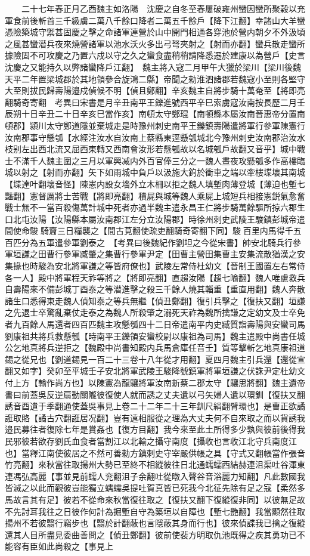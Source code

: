 　　二十七年春正月乙酉魏主如洛陽　沈慶之自冬至春屢破雍州蠻因蠻所聚穀以充軍食前後斬首三千級虜二萬八千餘口降者二萬五千餘戶【降下江翻】幸諸山大羊蠻憑險築城守禦甚固慶之擊之命諸軍連營於山中開門相通各穿池於營内朝夕不外汲頃之風甚蠻潜兵夜來燒營諸軍以池水沃火多出弓弩夾射之【射而亦翻】蠻兵散走蠻所據險固不可攻慶之乃置六戍以守之久之蠻食盡稍稍請降悉遷於建康以為營戶【史言沈慶之又能持久以弊諸蠻降戶江翻】　魏主將入寇二月甲午大獵於梁川【梁川後魏天平二年置梁城郡於其地領參合旋鴻二縣】帝聞之勑淮泗諸郡若魏寇小至則各堅守大至則拔民歸壽陽邉戍偵候不明【偵且鄭翻】辛亥魏主自將步騎十萬奄至【將即亮翻騎奇寄翻　考異曰宋書是月辛丑南平王鑠進號西平辛巳索虜寇汝南按長歷二月壬辰朔十日辛丑二十日辛亥巳當作亥】南頓太守鄭琨【南頓縣本屬汝南晉惠帝分置南頓郡】潁川太守鄭道隱並棄城走是時豫州刺史南平王鑠鎮壽陽遣將軍行參軍陳憲行汝南郡事守懸瓠【水經注汝水自汝南上蔡縣東逕懸瓠城北今豫州刺史汝南郡治汝水枝别左出西北流又屈西東轉又西南會汝形若懸瓠故以名城瓠戶故翻又音乎】城中戰士不滿千人魏主圍之三月以軍興减内外百官俸三分之一魏人晝夜攻懸瓠多作高樓臨城以射之【射而亦翻】矢下如雨城中負戶以汲施大鉤於衝車之端以牽樓堞壞其南城【堞達叶翻壞音怪】陳憲内設女墻外立木柵以拒之魏人填塹肉薄登城【薄迫也塹七豔翻】憲督厲將士苦戰【將即亮翻】積屍與城等魏人乘屍上城短兵相接憲鋭氣愈奮戰士無不一當百殺傷萬計城中死者亦過半魏主遣永昌王仁將步騎萬餘驅所掠六郡生口北屯汝陽【汝陽縣本屬汝南郡江左分立汝陽郡】時徐州刺史武陵王駿鎮彭城帝遣間使命駿騎齎三日糧襲之【間古莧翻使疏吏翻騎奇寄翻下同】駿百里内馬得千五百匹分為五軍遣參軍劉泰之　【考異曰後魏紀作劉坦之今從宋書】帥安北騎兵行參軍垣謙之田曹行參軍臧肇之集曹行參軍尹定【田曹主營田集曹主安集流散猶漢之安集掾也時駿為安北將軍謙之等皆府僚也】武陵左常侍杜幼文【晉制王國置左右常侍各一人】殿中將軍程天祚等將之【將即亮翻】直趨汝陽【趨七喻翻】魏人唯慮救兵自壽陽來不備彭城丁酉泰之等潜進擊之殺三千餘人燒其輜重【重直用翻】魏人奔散諸生口悉得東走魏人偵知泰之等兵無繼【偵丑鄭翻】復引兵擊之【復扶又翻】垣謙之先退士卒驚亂棄仗走泰之為魏人所殺肇之溺死天祚為魏所擒謙之定幼文及士卒免者九百餘人馬還者四百匹魏主攻懸瓠四十二日帝遣南平内史臧質詣壽陽與安蠻司馬劉康祖共將兵救懸瓠【時南平王鑠領安蠻校尉以康祖為司馬】魏主遣殿中尚書任城公乞地真將兵逆拒之【魏殿中尚書知殿内兵馬倉庫任音壬】質等擊斬乞地真康祖道錫之從兄也【劉道錫見一百二十三卷十八年從才用翻】夏四月魏主引兵還【還從宣翻又如字】癸卯至平城壬子安北將軍武陵王駿降號鎮軍將軍垣謙之伏誅尹定杜幼文付上方【輸作尚方也】以陳憲為龍驤將軍汝南新蔡二郡太守【驤思將翻】魏主遺帝書曰前蓋吳反逆扇動關隴彼復使人就而誘之丈夫遺以弓矢婦人遺以環釧【復扶又翻誘音酉遺于季翻通使蓋吳事見上卷二十二年二十三年釧尺絹翻臂環也】是曹正欲譎誑取賂【譎古穴翻誑居况翻】豈有遠相服從之理為大丈夫何不自來取之而以貨誘我邉民募往者復除七年是賞姦也【復方目翻】我今來至此土所得多少孰與彼前後得我民邪彼若欲存劉氏血食者當割江以北輸之攝守南度【攝收也言收江北守兵南度江也】當釋江南使彼居之不然可善勑方鎮刺史守宰嚴供帳之具【守式又翻帳當作張音竹亮翻】來秋當往取揚州大勢已至終不相縱彼往日北通蠕蠕西結赫連沮渠吐谷渾東連馮弘高麗【事並見前蠕人兖翻沮子余翻吐從暾入聲谷音浴麗力知翻】凡此數國我皆滅之以此而觀彼豈能獨立蠕蠕吳提吐賀真皆已死我今北征先除有足之寇【柔然多馬故言其有足】彼若不從命來秋當復往取之【復扶又翻下復縱復非同】以彼無足故不先討耳我往之日彼作何計為掘塹自守為築垣以自障也【塹七艷翻】我當顯然往取揚州不若彼翳行竊步也【翳於計翻蔽也言隱蔽其身而行也】彼來偵諜我已擒之復縱還其人目所盡見委曲善問之【偵丑鄭翻】彼前使裴方明取仇池既得之疾其勇功已不能容有臣如此尚殺之【事見上